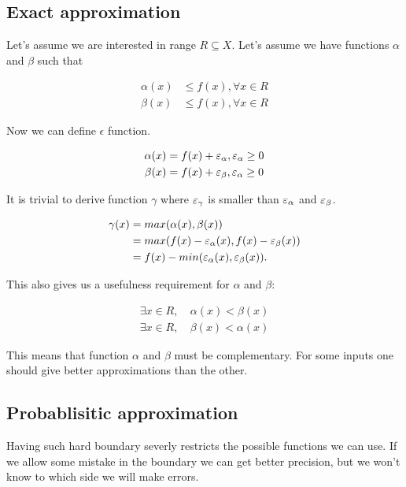 \documentclass [12pt]{article} %
\begin{document}
\subsection{Exact approximation}

Let's assume we are interested in range $R \subseteq X$. Let's assume we 
have functions $\alpha$ and $\beta$ such that

\begin{align*}
    \alpha(x) &\leq f(x), \forall x \in R \\
    \beta(x)  &\leq f(x), \forall x \in R 
\end{align*}

Now we can define $\epsilon$ function.

\begin{align*}
    \alpha(x) &= f(x) + \varepsilon_{\alpha}, \varepsilon_{\alpha} \geq 0 \\
    \beta(x)  &= f(x) + \varepsilon_{\beta}, \varepsilon_{\alpha} \geq 0
\end{align*}

It is trivial to derive function $\gamma$ where $\varepsilon_{\gamma}$ is smaller 
than $\varepsilon_{\alpha}$ and $\varepsilon_{\beta}$.

\begin{align*}
    \gamma(x)   &= max(\alpha(x), \beta(x)) \\
                &= max(f(x) - \varepsilon_{\alpha}(x), f(x) - \varepsilon_{\beta}(x)) \\
                &= f(x) - min(\varepsilon_{\alpha}(x), \varepsilon_{\beta}(x)).
\end{align*}

This also gives us a usefulness requirement for $\alpha$ and $\beta$:

\begin{align*}
    \exists x \in R, ~ &\alpha(x) < \beta(x) \\
    \exists x \in R, ~ &\beta(x) < \alpha(x)
\end{align*}

This means that function $\alpha$ and $\beta$ must be complementary.
For some inputs one should give better approximations than the other.

\subsection{Probablisitic approximation}

Having such hard boundary severly restricts the possible functions we can
use. If we allow some mistake in the boundary we can get better precision,
but we won't know to which side we will make errors.
\end{document}
